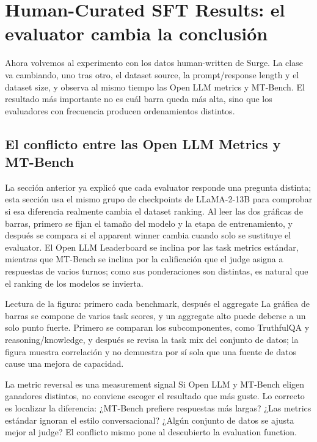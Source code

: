 \section{Human-Curated SFT Results: el evaluator cambia la conclusión}

Ahora volvemos al experimento con los datos human-written de Surge. La clase va cambiando, uno tras otro, el dataset source, la prompt/response length y el dataset size, y observa al mismo tiempo las Open LLM metrics y MT-Bench. El resultado más importante no es cuál barra queda más alta, sino que los evaluadores con frecuencia producen ordenamientos distintos.

\subsection{El conflicto entre las Open LLM Metrics y MT-Bench}

La sección anterior ya explicó que cada evaluator responde una pregunta distinta; esta sección usa el mismo grupo de checkpoints de LLaMA-2-13B para comprobar si esa diferencia realmente cambia el dataset ranking. Al leer las dos gráficas de barras, primero se fijan el tamaño del modelo y la etapa de entrenamiento, y después se compara si el apparent winner cambia cuando solo se sustituye el evaluator. El Open LLM Leaderboard se inclina por las task metrics estándar, mientras que MT-Bench se inclina por la calificación que el judge asigna a respuestas de varios turnos; como sus ponderaciones son distintas, es natural que el ranking de los modelos se invierta.


\begin{knowledgebox}{Lectura de la figura: primero cada benchmark, después el aggregate}
La gráfica de barras se compone de varios task scores, y un aggregate alto puede deberse a un solo punto fuerte. Primero se comparan los subcomponentes, como TruthfulQA y reasoning/knowledge, y después se revisa la task mix del conjunto de datos; la figura muestra correlación y no demuestra por sí sola que una fuente de datos cause una mejora de capacidad.
\end{knowledgebox}


\begin{warningbox}{La metric reversal es una measurement signal}
Si Open LLM y MT-Bench eligen ganadores distintos, no conviene escoger el resultado que más guste. Lo correcto es localizar la diferencia: ¿MT-Bench prefiere respuestas más largas? ¿Las metrics estándar ignoran el estilo conversacional? ¿Algún conjunto de datos se ajusta mejor al judge? El conflicto mismo pone al descubierto la evaluation function.
\end{warningbox}


